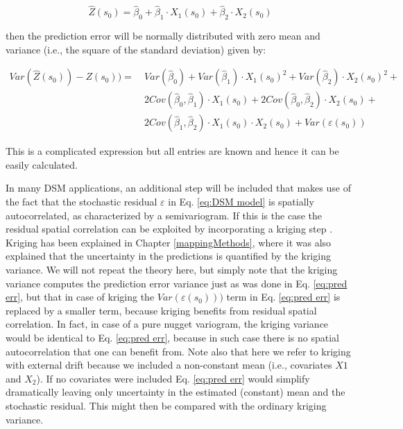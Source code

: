 \documentclass[10pt,b5paper,]{book}
\theoremstyle{definition}
\theoremstyle{definition}
\theoremstyle{definition}
\theoremstyle{remark}
\begin{document}
\begin{equation}
\label{eq:cal regmodel}
\hat{Z}(s_0) = \hat{\beta}_0 + \hat{\beta}_1  \cdot X_1 (s_0) +  \hat{\beta}_2 \cdot X_2 (s_0)
\end{equation}

then the prediction error will be normally distributed with zero mean
and variance (i.e., the square of the standard deviation) given by:

\begin{equation}
\begin{aligned}
\label{eq:pred err}
Var(\hat{Z}(s_0)) - Z(s_0)) = & \ Var(\hat{\beta}_0) + Var(\hat{\beta}_1)  \cdot X_1 (s_0)^2 +  Var(\hat{\beta}_2) \cdot X_2 (s_0)^2 + \\
                      & \ 2 Cov(\hat{\beta}_0,\hat{\beta}_1) \cdot  X_1 (s_0) + 2 Cov(\hat{\beta}_0,\hat{\beta}_2) \cdot X_2 (s_0) + \\
                      & \ 2 Cov(\hat{\beta}_1,\hat{\beta}_2) \cdot  X_1 (s_0) \cdot  X_2 (s_0) + Var(\varepsilon(s_0))
\end{aligned}
\end{equation}

This is a complicated expression but all entries are known and hence it
can be easily calculated.

In many DSM applications, an additional step will be included that makes
use of the fact that the stochastic residual \({\varepsilon}\) in Eq.
\ref{eq:DSM model} is spatially autocorrelated, as characterized by a
semivariogram. If this is the case the residual spatial correlation can
be exploited by incorporating a kriging step \citep{hengl2004generic}.
Kriging has been explained in Chapter \ref{mappingMethods}, where it was
also explained that the uncertainty in the predictions is quantified by
the kriging variance. We will not repeat the theory here, but simply
note that the kriging variance computes the prediction error variance
just as was done in Eq. \ref{eq:pred err}, but that in case of kriging
the \({Var(\varepsilon(s_0)))}\) term in Eq. \ref{eq:pred err} is
replaced by a smaller term, because kriging benefits from residual
spatial correlation. In fact, in case of a pure nugget variogram, the
kriging variance would be identical to Eq. \ref{eq:pred err}, because in
such case there is no spatial autocorrelation that one can benefit from.
Note also that here we refer to kriging with external drift because we
included a non-constant mean (i.e., covariates \({X1}\) and \({X_2}\)).
If no covariates were included Eq. \ref{eq:pred err} would simplify
dramatically leaving only uncertainty in the estimated (constant) mean
and the stochastic residual. This might then be compared with the
ordinary kriging variance.
\end{document}
